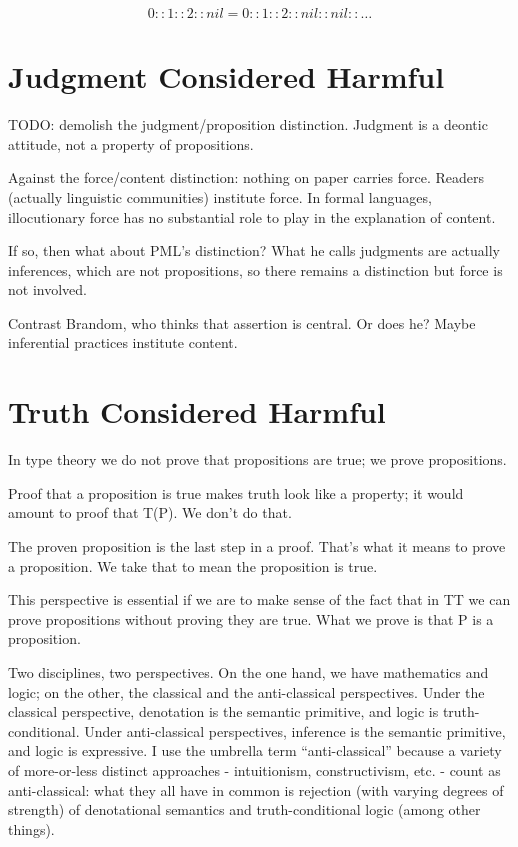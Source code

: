 \documentclass{article}
\begin{document}
\[0::1::2::nil  =  0::1::2::nil::nil:: \ldots\]


\section{Judgment Considered Harmful}

TODO: demolish the judgment/proposition distinction.  Judgment is a
deontic attitude, not a property of propositions.

Against the force/content distinction: nothing on paper carries force.
Readers (actually linguistic communities) institute force.  In formal
languages, illocutionary force has no substantial role to play in the
explanation of content.

If so, then what about PML's distinction?  What he calls judgments are
actually inferences, which are not propositions, so there remains a
distinction but force is not involved.

Contrast Brandom, who thinks that assertion is central.  Or does he?
Maybe inferential practices institute content.

\section{Truth Considered Harmful}

In type theory we do not prove that propositions are true; we prove propositions.

Proof that a proposition is true makes truth look like a property; it
would amount to proof that T(P).  We don't do that.

The proven proposition is the last step in a proof.  That's what it
means to prove a proposition.  We take that to mean the proposition is true.

This perspective is essential if we are to make sense of the fact that
in TT we can prove propositions without proving they are true.  What
we prove is that P is a proposition.

Two disciplines, two perspectives.  On the one hand, we have
mathematics and logic; on the other, the classical and the
anti-classical perspectives.  Under the classical perspective,
denotation is the semantic primitive, and logic is truth-conditional.
Under anti-classical perspectives, inference is the semantic
primitive, and logic is expressive.  I use the umbrella term
``anti-classical'' because a variety of more-or-less distinct
approaches - intuitionism, constructivism, etc. - count as
anti-classical: what they all have in common is rejection (with
varying degrees of strength) of denotational semantics and
truth-conditional logic (among other things).
\end{document}
